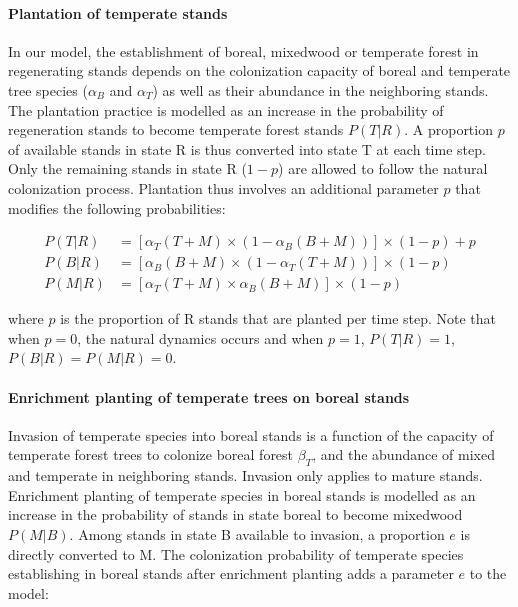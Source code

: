 \documentclass[12pt]{article}
\begin{document}
\hypertarget{plantation-of-temperate-stands}{%
\paragraph{Plantation of temperate
stands}\label{plantation-of-temperate-stands}}

In our model, the establishment of boreal, mixedwood or temperate forest
in regenerating stands depends on the colonization capacity of boreal
and temperate tree species (\(\alpha_B\) and \(\alpha_T\)) as well as
their abundance in the neighboring stands. The plantation practice is
modelled as an increase in the probability of regeneration stands to
become temperate forest stands \(P(T|R)\). A proportion \(p\) of
available stands in state R is thus converted into state T at each time
step. Only the remaining stands in state R (\(1-p\)) are allowed to
follow the natural colonization process. Plantation thus involves an
additional parameter \(p\) that modifies the following probabilities:

\[
\begin{aligned}
  P(T|R) &= [\alpha_T (T+M) \times (1-\alpha_B (B+M))] \times (1 - p) +  p \\
  P(B|R) &= [\alpha_B (B+M) \times (1-\alpha_T (T+M))] \times (1 - p) \\
  P(M|R) &= [\alpha_T (T+M) \times \alpha_B (B+M)] \times (1 - p)
\end{aligned}
\]

where \(p\) is the proportion of R stands that are planted per time
step. Note that when \(p=0\), the natural dynamics occurs and when
\(p=1\), \(P(T|R)=1\), \(P(B|R)=P(M|R)=0\).

\hypertarget{enrichment-planting-of-temperate-trees-on-boreal-stands}{%
\paragraph{Enrichment planting of temperate trees on boreal
stands}\label{enrichment-planting-of-temperate-trees-on-boreal-stands}}

Invasion of temperate species into boreal stands is a function of the
capacity of temperate forest trees to colonize boreal forest
\(\beta_T\), and the abundance of mixed and temperate in neighboring
stands. Invasion only applies to mature stands. Enrichment planting of
temperate species in boreal stands is modelled as an increase in the
probability of stands in state boreal to become mixedwood \(P(M|B)\).
Among stands in state B available to invasion, a proportion \(e\) is
directly converted to M. The colonization probability of temperate
species establishing in boreal stands after enrichment planting adds a
parameter \(e\) to the model:
\end{document}
